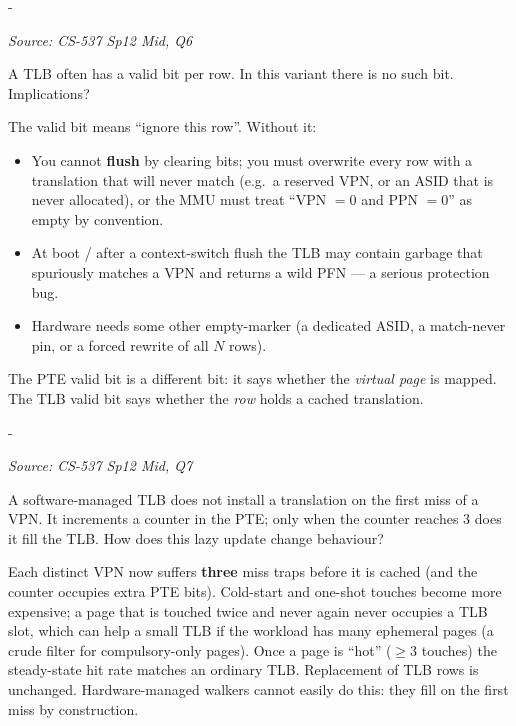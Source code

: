 \documentclass[11pt,a4paper]{article}
\makeatletter
\newcommand{\keepspace}[1]{\par\penalty-100\begingroup
  \setlength{\dimen@}{#1}\dimen@ii\pagegoal\advance\dimen@ii-\pagetotal
  \ifdim\dimen@>\dimen@ii\ifdim\dimen@ii>\z@\vfil\fi\break\fi\endgroup}
\newcounter{qn}[section]
\newenvironment{Qn}[4]{%
  \refstepcounter{qn}\keepspace{7\baselineskip}%
  \begin{tcolorbox}[qboxstyle, title={Q\thesection.\theqn\ \ [#1 \textbar\ #2]\ \ #4}]%
  {\footnotesize\color{g3}\textit{Source: #3}}\par\smallskip%
}{%
  \end{tcolorbox}%
}
\newenvironment{Sol}{%
  \begin{tcolorbox}[sboxstyle, title={Solution}]%
}{%
  \end{tcolorbox}\vspace{0.35em}%
}
\makeatother
\begin{document}
\begin{Qn}{Medium}{Lect 13}{CS-537 Sp12 Mid, Q6}{A TLB with no valid bit}
A TLB often has a valid bit per row. In this variant there is no such
bit. Implications?
\end{Qn}
\begin{Sol}
The valid bit means ``ignore this row''. Without it:
\begin{itemize}
\item You cannot \textbf{flush} by clearing bits; you must overwrite
      every row with a translation that will never match (e.g.\ a
      reserved VPN, or an ASID that is never allocated), or the MMU
      must treat ``VPN $=0$ and PPN $=0$'' as empty by convention.
\item At boot / after a context-switch flush the TLB may contain
      garbage that spuriously matches a VPN and returns a wild PFN ---
      a serious protection bug.
\item Hardware needs some other empty-marker (a dedicated ASID, a
      match-never pin, or a forced rewrite of all $N$ rows).
\end{itemize}
The PTE valid bit is a different bit: it says whether the \emph{virtual
page} is mapped. The TLB valid bit says whether the \emph{row} holds a
cached translation.
\end{Sol}

\begin{Qn}{Medium}{Lect 13}{CS-537 Sp12 Mid, Q7}{Lazy TLB fill: install only on the third miss}
A software-managed TLB does not install a translation on the first miss
of a VPN. It increments a counter in the PTE; only when the counter
reaches 3 does it fill the TLB. How does this lazy update change
behaviour?
\end{Qn}
\begin{Sol}
Each distinct VPN now suffers \textbf{three} miss traps before it is
cached (and the counter occupies extra PTE bits). Cold-start and
one-shot touches become more expensive; a page that is touched twice
and never again never occupies a TLB slot, which can help a small TLB
if the workload has many ephemeral pages (a crude filter for
compulsory-only pages). Once a page is ``hot'' ($\ge 3$ touches) the
steady-state hit rate matches an ordinary TLB. Replacement of TLB rows
is unchanged. Hardware-managed walkers cannot easily do this: they
fill on the first miss by construction.
\end{Sol}
\end{document}

